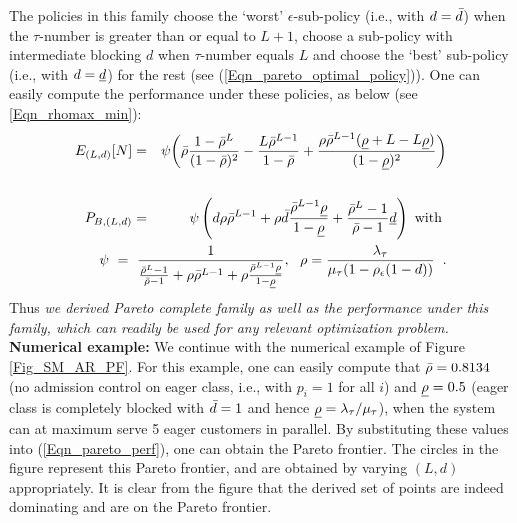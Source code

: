 The policies in this family choose the
`worst' $\epsilon$-sub-policy (i.e., with $d={\bar d}$) when the
$\tau$-number is greater than or equal to $L+1$, choose a sub-policy
with intermediate blocking $d$ when $\tau$-number equals $L$ and
choose the `best' sub-policy (i.e., with $d = {\underline d}$) for the rest
(see (\ref{Eqn_pareto_optimal_policy})).  One can easily compute the
performance under these policies, as below (see \ref{Eqn_rhomax_min}):
{\begin{eqnarray}
\label{Eqn_pareto_perf}
E_{(L,d)}[N] &=& \psi \bigg ( \rmax \frac{1-\rmax^L}{(1-\rmax)^2} -
\frac{ L \rmax^{L - 1} }{ 1- \rmax } + \frac{\rho \rmax^{L-1} (\rmin +
  L - L \rmin) }{ (1- \rmin)^2 } \bigg ) \nonumber \\
  \nonumber \\
P_{B,(L,d)} &=&  \psi \left( d \rho \rmax^{L-1} + \rho \dmax  \frac {
 \rmax^{L-1} \rmin}{1 -\rmin}  + \frac{\rmax^{L}-1  }{\rmax- 1 }  \dmin    \right )   \mbox{ with  }  \nonumber  \\
&& \hspace{-19mm}
 \psi \ = \ \frac{1}
{
\frac{\rmax^L - 1}{\rmax- 1}+ \rho \rmax^{L-1}  + \rho  \frac{ \rmax^{L-1} \rmin  }{1 -\rmin}    
},  \  \   \rho =  \frac { \lambda_\tau } { \mu_\tau  (1-\rho_\epsilon (1- d))  } \hspace{2mm}.
\end{eqnarray}}
Thus {\it we derived Pareto complete family as well as the performance under this family, which can readily be used for any relevant optimization problem. }
\\


{\bf Numerical example:} We continue with the numerical example of
Figure \ref{Fig_SM_AR_PF}.  For this example, one can easily compute
that ${\bar \rho}  =  0.8134$ (no admission control on eager class, i.e., with $p_i = 1$ for all $i$) and ${\underline \rho} = 0.5$ (eager class is completely blocked with ${\bar d} = 1$ 
and hence ${\underline \rho} = \lambda_\tau/ \mu_\tau$), when the system can at maximum serve 5 eager customers in parallel.  By substituting these values
into (\ref{Eqn_pareto_perf}), one can obtain the Pareto frontier. The
circles in the figure represent this Pareto frontier, and are obtained
by varying $(L, d)$ appropriately.  It is clear from the figure that
the derived set of points are indeed dominating and are on the Pareto
frontier.





